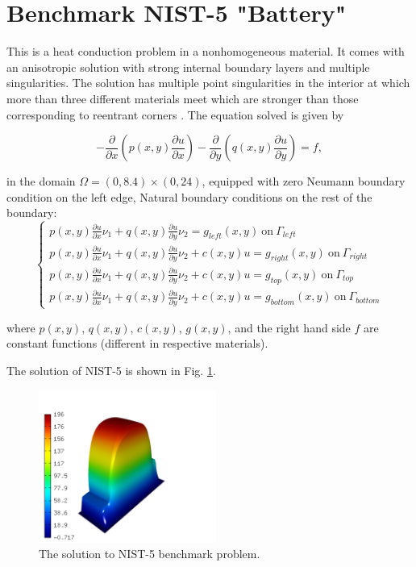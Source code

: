 \section{Benchmark NIST-5 "Battery"}
\label{sec:bench-5}

This is a heat conduction problem in a nonhomogeneous material.
It comes with an anisotropic solution with strong internal boundary
layers and multiple singularities.
The solution has multiple point singularities in the interior at which
more than three different materials meet which are stronger than those
corresponding to reentrant corners \cite{demkowicz-1}.
The equation solved is given by

\begin{equation} \label{heat-conduction}
-\frac{\partial }{\partial x}\left(p(x, y)\frac{\partial u}{\partial x}\right)
-\frac{\partial }{\partial y}\left(q(x, y)\frac{\partial u}{\partial y}\right) = f,
\end{equation}

in the domain $\Omega = (0, 8.4) \times (0, 24)$, equipped with
zero Neumann boundary condition on the left edge, Natural boundary
conditions on the rest of the boundary:
\begin{equation}
\left\{
\begin{array}{l}
\displaystyle p(x, y)\frac{\partial u}{\partial x}\nu_1 + q(x, y)\frac{\partial u}{\partial y}\nu_2 = g_{left}(x, y) \ \mbox{on} \  \Gamma_{left} \\
\displaystyle p(x, y)\frac{\partial u}{\partial x}\nu_1 + q(x, y)\frac{\partial u}{\partial y}\nu_2 + c(x, y)u = g_{right}(x, y) \ \mbox{on} \ \Gamma_{right} \\
\displaystyle p(x, y)\frac{\partial u}{\partial x}\nu_1 + q(x, y)\frac{\partial u}{\partial y}\nu_2 + c(x, y)u = g_{top}(x, y) \ \mbox{on} \ \Gamma_{top} \\
\displaystyle p(x, y)\frac{\partial u}{\partial x}\nu_1 + q(x, y)\frac{\partial u}{\partial y}\nu_2 + c(x, y)u = g_{bottom}(x, y) \ \mbox{on} \ \Gamma_{bottom}
\end{array}
\right.
\end{equation}

where $p(x, y)$, $q(x, y)$, $c(x, y)$, $g(x, y)$, and the right hand side $f$ are constant functions (different in respective materials).

The solution of NIST-5 is shown in Fig. \ref{fig:sln-nist05}.

\begin{figure}[!ht]
\centering
\includegraphics[height=5cm]{nist/nist-5/solution.png}
\caption{The solution to NIST-5 benchmark problem.}
\label{fig:sln-nist05}
\end{figure}

